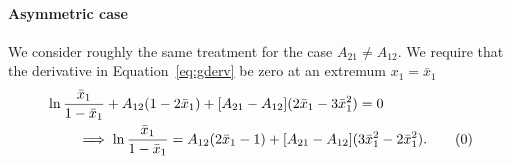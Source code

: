 \paragraph{Asymmetric case}
We consider roughly the same treatment for the case $A_{21} \neq A_{12}$.
We require that the derivative in Equation~\ref{eq:gderv} be zero at an
extremum $x_1 = \bar x_1$
\begin{alignat*}{2}\label{eq:asymm}
    \MoveEqLeft \ln\dfrac{\bar x_1}{1-\bar x_1} + A_{12}(1-2\bar x_1) 
    + [A_{21} - A_{12}](2\bar x_1 - 3\bar x_1^2) = 0 \\
    &\implies
    \ln\dfrac{\bar x_1}{1-\bar x_1} = A_{12}(2\bar x_1 - 1) + 
    [A_{21} - A_{12}](3\bar x_1^2-2\bar x_1^2). \tag{\theequation}
\end{alignat*}

